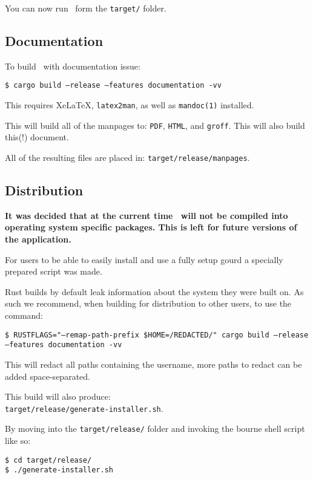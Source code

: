 You can now run \gourd\ form the \texttt{target/} folder.

\subsection{Documentation}
\label{sec:docbuild}

To build \gourd\ with documentation issue:

\texttt{\$ cargo build --release --features documentation -vv}
\vspace{0.5cm}

\noindent This requires Xe\LaTeX, \texttt{latex2man}, as well as \texttt{mandoc(1)} installed.

This will build all of the manpages to: \texttt{PDF}, \texttt{HTML}, and \texttt{groff}.
This will also build this(!) document.

All of the resulting files are placed in: \texttt{target/release/manpages}.


\subsection{Distribution}
\textcolor{red!30!black}{\textbf{
  It was decided that at the current time \gourd\ will not be compiled into
  operating system specific packages. This is left for future versions of the application.
}}
\vspace{0.3cm}

For users to be able to easily install and use a fully setup gourd a specially prepared script was made.

Rust builds by default leak information about the system they were built on.
As such we recommend, when building for distribution to other users, to use the command:

\texttt{\$ RUSTFLAGS="--remap-path-prefix \$HOME=/REDACTED/" cargo build --release --features documentation -vv}

This will redact all paths containing the username, more paths to redact can be added space-separated.

This build will also produce: \\
\texttt{target/release/generate-installer.sh}.

By moving into the \texttt{target/release/} folder and invoking the bourne shell script like so:

\begin{verbatim}
$ cd target/release/
$ ./generate-installer.sh
\end{verbatim}

